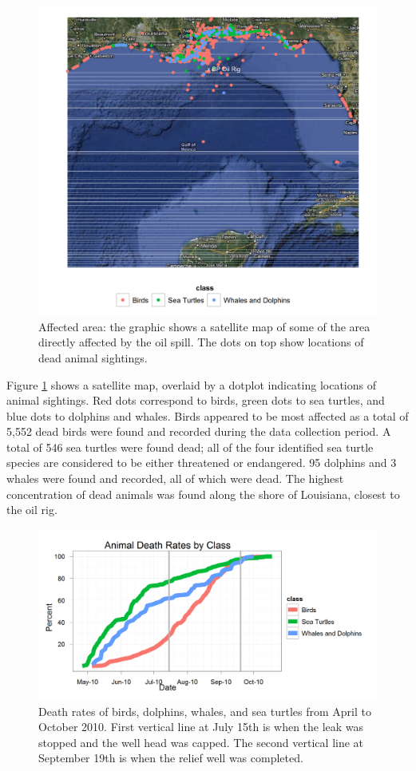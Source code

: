 \documentclass[11pt]{article}
\begin{document}
\begin{figure}[htbp] %
   \centering
   \includegraphics[width=4.5in]{animal_deaths.png} 
   \caption{Affected area: the graphic shows a satellite map of some of the area directly affected by the oil spill. The dots on top show locations of dead animal sightings. }
   \label{deaths}
\end{figure}
Figure \ref{deaths} shows a satellite map, overlaid by a dotplot indicating locations of animal sightings. Red dots correspond to birds, green dots to sea turtles, and blue dots to dolphins and whales.  Birds appeared to be most affected as a total of 5,552 dead birds were found and recorded during the data collection period.  A total of 546 sea turtles were found dead; all of the four identified sea turtle species are considered to be either threatened or endangered.  95 dolphins and 3 whales were found and recorded, all of which were dead. The highest concentration of dead animals was found along the shore of Louisiana, closest to the oil rig.  

\begin{figure}[htbp] %
   \centering
   \includegraphics[width=5in]{death-rates.png} 
   \caption{Death rates of birds, dolphins, whales, and sea turtles from April to October 2010. First vertical line at July 15th is when the leak was stopped and the well head was capped.  The second vertical line at September 19th is when the relief well was completed. }
   \label{death rates}
\end{figure}
\end{document}
